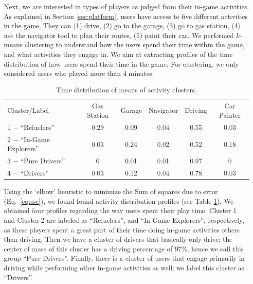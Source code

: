 \documentclass[preprint,authoryear,12pt]{elsarticle}
\begin{document}

Next, we are interested in types of players as judged from their in-game activities.
As explained in Section \ref{sec:platform}, users have access to five different activities in the game, They can (1) drive, (2) go to the garage, (3) go to gas station, (4) use the navigator tool to plan their routes, (5) paint their car.
We performed $k$-means clustering to understand how the users spend their time within the game, and what activities they engage in. We aim at extracting profiles of the time distribution of how users spend their time in the game.
For clustering, we only considered users who played more than 4 minutes. 


\begin{table}[tb]
	\renewcommand*{\arraystretch}{1.2}
	\caption{Time distribution of means of activity clusters.}
	\begin{center}
		\begin{tabular}{l|c|c|c|c|c}
			Cluster/Label & Gas Station &	Garage & Navigator & Driving & Car Painter\\
			1 $-$ ``Refuelers'' &	0.29 &	0.09 &	0.04 &	0.55 &	0.03\\
			2 $-$ ``In-Game Explorers'' &	0.03 &	0.24 &	0.02 &	0.52 &	0.18 \\
			3 $-$ ``Pure Drivers'' &	0 &	0.01 &	0.01 &	0.97 &	0  \\
			4 $-$ ``Drivers'' &	0.03 &	0.12 &	0.04 &	0.78 &	0.03   \\
		\end{tabular}
	\end{center}
	\label{T:cluster_activities}
\end{table}

Using the `elbow' heuristic to minimize the Sum of squares due to error (Eq.~\ref{eq:sse}), we found found activity distribution profiles (see Table \ref{T:cluster_activities}).
We obtained four profiles regarding the way users spent their play time. Cluster 1 and Cluster 2 are labeled as ``Refuelers'', and ``In-Game Explorers'', respectively, as these players spent a great part of their time doing in-game activities others than driving. Then we have a cluster of drivers that basically only drive; the center of mass of this cluster has a driving percentage of 97\%, hence we call this group ``Pure Drivers''. Finally, there is a cluster of users that engage primarily in driving while performing other in-game activities as well; we label this cluster as ``Drivers''.
\end{document}
